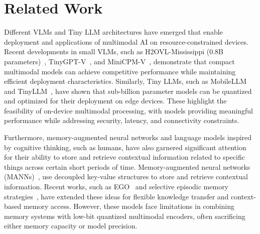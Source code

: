 \section{Related Work}
\label{sec:relworks}

Different VLMs and Tiny LLM architectures have emerged that enable deployment and applications of multimodal AI on resource-constrained devices. Recent developments in small VLMs, such as H2OVL-Mississippi (0.8B parameters)~\citep{galib-2024-h2ovlmississippivisionlanguagemodels}, TinyGPT-V~\citep{tinygpt-v-2024}, and MiniCPM-V~\citep{minicpm-v-2024}, demonstrate that compact multimodal models can achieve competitive performance while maintaining efficient deployment characteristics. Similarly, Tiny LLMs, such as MobileLLM~\citep{mobilellm-2024} and TinyLLM~\citep{tinyllm-edge-2024}, have shown that sub-billion parameter models can be quantized and optimized for their deployment on edge devices. These highlight the feasibility of on-device multimodal processing, with models providing meaningful performance while addressing security, latency, and connectivity constraints.

Furthermore, memory-augmented neural networks and language models inspired by cognitive thinking, such as humans, have also garnered significant attention for their ability to store and retrieve contextual information related to specific things across certain short periods of time. 
Memory-augmented neural networks (MANNs)~\citep{graves-dynamicexternalmemory-2016}, use decoupled key-value structures to store and retrieve contextual information. Recent works, such as EGO~\citep{ego-episodic-2024} and selective episodic memory strategies~\citep{episodic-memory-neural-2022}, have extended these ideas for flexible knowledge transfer and context-based memory access. However, these models face limitations in combining memory systems with low-bit quantized multimodal encoders, often sacrificing either memory capacity or model precision.

